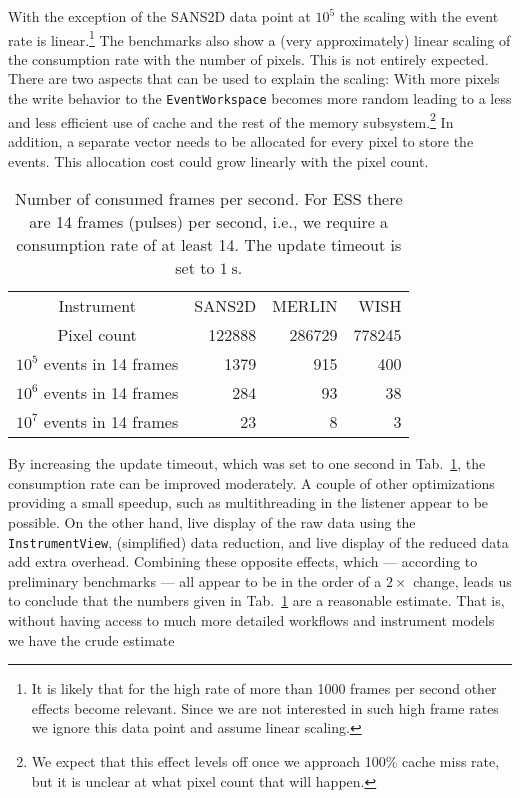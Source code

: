 \documentclass[a4paper,english,numbers=noenddot,bibliography=totoc,chapterprefix=on,DIV=12]{scrartcl}
\begin{document}
With the exception of the SANS2D data point at $10^5$ the scaling with the event rate is linear.\footnote{It is likely that for the high rate of more than 1000 frames per second other effects become relevant. Since we are not interested in such high frame rates we ignore this data point and assume linear scaling.}
The benchmarks also show a (very approximately) linear scaling of the consumption rate with the number of pixels.
This is not entirely expected.
There are two aspects that can be used to explain the scaling:
With more pixels the write behavior to the \verb|EventWorkspace| becomes more random leading to a less and less efficient use of cache and the rest of the memory subsystem.\footnote{We expect that this effect levels off once we approach 100\% cache miss rate, but it is unclear at what pixel count that will happen.}
In addition, a separate vector needs to be allocated for every pixel to store the events.
This allocation cost could grow linearly with the pixel count.

\begin{table}
  \centering
  \begin{tabular}{c|rrr}
    Instrument & SANS2D & MERLIN & WISH\\
    Pixel count & 122888 & 286729 & 778245\\
    \hline
    $10^5$ events in 14 frames & 1379 & 915 & 400 \\
    $10^6$ events in 14 frames & 284 & 93 & 38 \\
    $10^7$ events in 14 frames & 23 & 8 & 3 \\
  \end{tabular}
  \caption{\label{tab:consumption-rate}Number of consumed frames per second. For ESS there are 14 frames (pulses) per second, i.e., we require a consumption rate of at least 14. The update timeout is set to $1~\mathrm{s}$.}
\end{table}

By increasing the update timeout, which was set to one second in Tab.~\ref{tab:consumption-rate}, the consumption rate can be improved moderately.
A couple of other optimizations providing a small speedup, such as multithreading in the listener appear to be possible.
On the other hand, live display of the raw data using the \verb|InstrumentView|, (simplified) data reduction, and live display of the reduced data add extra overhead.
Combining these opposite effects, which --- according to preliminary benchmarks --- all appear to be in the order of a $2\times$ change, leads us to conclude that the numbers given in Tab.~\ref{tab:consumption-rate} are a reasonable estimate.
That is, without having access to much more detailed workflows and instrument models we have the crude estimate
\end{document}
